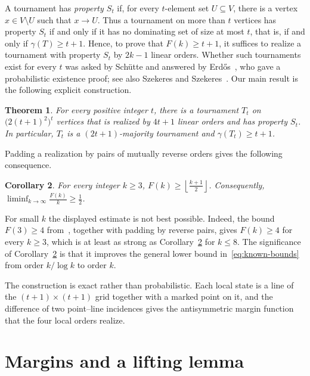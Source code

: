 \documentclass[12pt]{article}
\newtheorem{theorem}{Theorem}
\newtheorem{corollary}[theorem]{Corollary}
\theoremstyle{remark}
\begin{document}
A tournament has \emph{property $S_t$} if, for every $t$-element set
$U\subseteq V$, there is a vertex $x\in V\setminus U$ such that
$x\to U$. Thus a tournament on more than $t$ vertices has property $S_t$ if and
only if it has no dominating set of size at most $t$, that is, if and only if $\gamma(T)\ge t+1$. 
Hence, to prove that $F(k) \ge t+1$,
it suffices to realize a tournament with property $S_t$ by $2k-1$ linear orders. Whether
such tournaments exist for every $t$ was asked by Sch\"utte and answered by
Erd\H{o}s~\cite{ErdosProblem}, who gave a probabilistic existence proof; see also Szekeres and
Szekeres~\cite{SzekeresSzekeres}. Our main result is the following explicit construction.

\begin{theorem}\label{thm:construction}
For every positive integer $t$, there is a tournament $T_t$ on
$\bigl(2(t+1)^2\bigr)^t
$ vertices that is realized by $4t+1$ linear orders and has property
$S_t$.  In particular, $T_t$ is a $(2t+1)$-majority tournament and
$\gamma(T_t)\ge t+1$.
\end{theorem}

Padding a realization by pairs of mutually reverse orders gives the
following consequence.

\begin{corollary}\label{cor:linear}
For every integer $k\ge 3$, $F(k)\ge \left\lfloor\frac{k+1}{2}\right\rfloor$.
Consequently,
$\liminf_{k\to\infty}\frac{F(k)}{k}\ge \frac12$.
\end{corollary}

For small $k$ the displayed estimate is not best possible.  Indeed, the
bound $F(3)\ge4$ from~\cite{ABKKW}, together with padding by reverse
pairs, gives $F(k)\ge4$ for every $k\ge3$, which is at least as strong as Corollary~\ref{cor:linear} for $k\le8$. The significance of
Corollary~\ref{cor:linear} is that it improves the general lower bound
in~\eqref{eq:known-bounds} from order $k/\log k$ to order $k$.

The construction is exact rather than probabilistic.  Each local state is a line of the $(t+1)\times(t+1)$ grid together with a marked point on it, and the difference of two point--line incidences gives the antisymmetric margin function that the four local orders realize.

\section{Margins and a lifting lemma}
\end{document}
